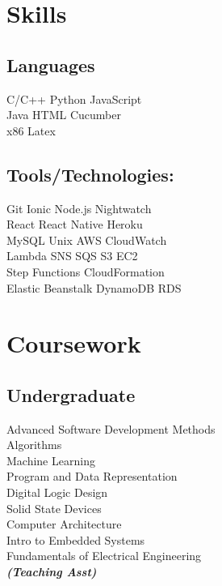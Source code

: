 \documentclass[]{deedy-resume-openfont}
\begin{document}
\begin{minipage}[t]{0.33\textwidth}

\section{Skills}
\subsection{Languages}
C/C++ \textbullet{}  Python  \textbullet{} JavaScript \textbullet{}\\
Java   \textbullet{} HTML \textbullet{} Cucumber \textbullet{} \\
x86 \textbullet{}   Latex \\
\sectionsep
\subsection{Tools/Technologies:}
Git \textbullet{} Ionic \textbullet{} Node.js \textbullet{} Nightwatch \textbullet{}\\ 
React  \textbullet{} React Native \textbullet{}  Heroku  \textbullet{} \\
MySQL   \textbullet{} Unix \textbullet{} AWS \textbullet{} CloudWatch  \textbullet{}\\
Lambda  \textbullet{} SNS  \textbullet{} SQS  \textbullet{} S3    \textbullet{} EC2 \textbullet{}\\
Step Functions  \textbullet{} CloudFormation  \textbullet{} \\
Elastic Beanstalk  \textbullet{} DynamoDB  \textbullet{}RDS \textbullet{}  \\

\sectionsep


\section{Coursework}
\subsection{Undergraduate}
Advanced Software Development Methods \\
Algorithms \\
Machine Learning \\
Program and Data Representation \\
Digital Logic Design \\
Solid State Devices \\
Computer Architecture \\
Intro to Embedded Systems \\
Fundamentals of Electrical Engineering \\
{\footnotesize \textit{\textbf{(Teaching Asst) }}} \\
\sectionsep


%
%

\end{minipage} 
\end{document}
